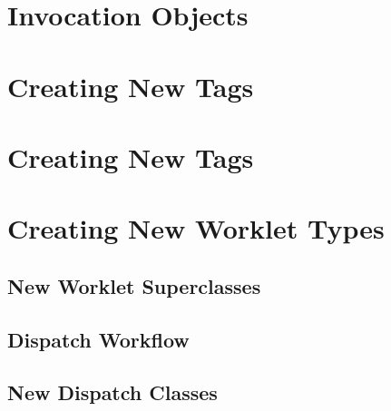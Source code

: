 



\section{Invocation Objects}
\label{sec:InvocationObjects}


\section{Creating New \protect\controlsignature Tags}
\label{sec:NewControlSignatureTags}


\section{Creating New \protect\executionsignature Tags}
\label{sec:NewExecutionSignatureTags}


\section{Creating New Worklet Types}
\label{sec:NewWorkletTypes}

\subsection{New Worklet Superclasses}
\label{sec:NewWorkletSuperclasses}

\subsection{Dispatch Workflow}
\label{sec:DispatchWorkflow}

\subsection{New Dispatch Classes}
\label{sec:NewDispatchClasses}
